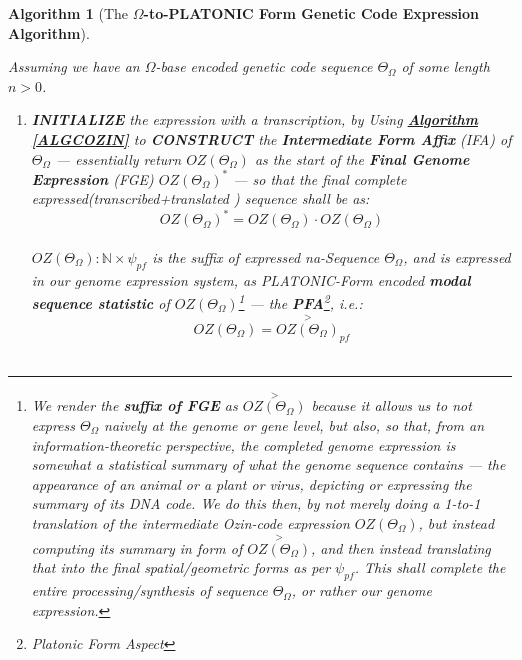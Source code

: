 \documentclass[a4paper, 18pt]{book} %
\newtheorem{alg}{Algorithm}
\begin{document}
\begin{alg}[The \textbf{$\Omega$-to-PLATONIC Form Genetic Code Expression Algorithm}]
\label{ALGCOZINPLATO}

Assuming we have an $\Omega$-base encoded genetic code sequence $\Theta_\Omega$ of some length $n > 0$.

\begin{enumerate}
    \item{\textbf{INITIALIZE} the expression with a transcription, by Using \textbf{\hyperref[ALGCOZIN]{Algorithm \ref{ALGCOZIN}}} to \textbf{CONSTRUCT} the \textbf{Intermediate Form Affix} (IFA) of $\Theta_\Omega$ --- essentially return $OZ(\Theta_\Omega)$ as the start of the \textbf{Final Genome Expression} (FGE) $\boxed{OZ(\Theta_\Omega)}^*$ --- so that the final complete expressed(transcribed+translated ) sequence shall be as:\\

\begin{equation}
\label{EQTRANSLGENSEQ}
\boxed{OZ(\Theta_\Omega)}^* = OZ(\Theta_\Omega)\cdot\boxed{OZ(\Theta_\Omega)}
\end{equation}\\

$\boxed{OZ(\Theta_\Omega)}: \mathbb{N} \times \psi_{pf}$ is the suffix of expressed na-Sequence $\Theta_\Omega$, and is expressed in our genome expression system, as PLATONIC-Form encoded \textbf{modal sequence statistic} of $OZ(\Theta_\Omega)$\footnote{We render the \textbf{suffix of FGE} as $\overset{>}{OZ(\Theta_\Omega)}$ because it allows us to not express $\Theta_\Omega$ naively at the genome or gene level, but also, so that, from an information-theoretic perspective, the completed genome expression is somewhat a statistical summary of what the genome sequence contains --- the appearance of an animal or a plant or virus, depicting or expressing the summary of its DNA code. We do this then, by not merely doing a 1-to-1 translation of the intermediate Ozin-code expression $OZ(\Theta_\Omega)$, but instead computing its summary in form of $\overset{>}{OZ(\Theta_\Omega)}$, and then instead translating that into the final spatial/geometric forms as per $\psi_{pf}$. This shall complete the entire processing/synthesis of sequence $\Theta_\Omega$, or rather our genome expression.} --- the \textbf{PFA}\footnote{Platonic Form Aspect}, i.e.:\\

\begin{equation}
 \boxed{OZ(\Theta_\Omega)} = \boxed{\overset{>}{OZ(\Theta_\Omega)}}_{pf}
\end{equation}\\


}
\end{enumerate}
\end{alg}
\end{document}
